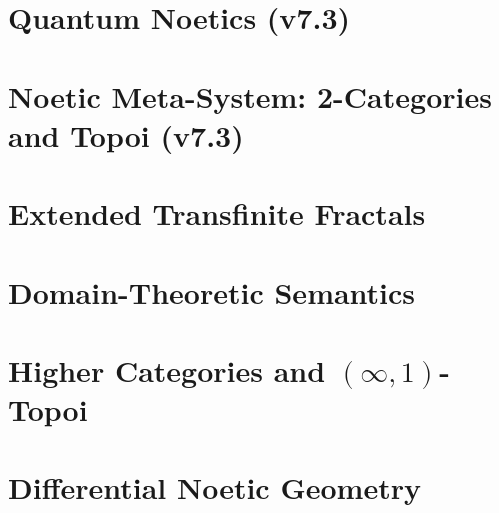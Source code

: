 \documentclass[11pt,twoside,openright]{book}
\theoremstyle{definition}
\theoremstyle{plain}
\theoremstyle{remark}
\begin{document}
\part{Quantum Noetics (v7.3)}
\label{part:quantum-track-v73}


\part{Noetic Meta-System: 2-Categories and Topoi (v7.3)}
\label{part:meta-track-v73}


\part{Extended Transfinite Fractals}
\label{part:extended-fractals}



\part{Domain-Theoretic Semantics}
\label{part:domain-semantics}



\part{Higher Categories and $(\infty,1)$-Topoi}
\label{part:higher-categories}



\part{Differential Noetic Geometry}
\label{part:noetic-geometry}
\end{document}
